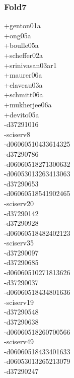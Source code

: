 \begin{multicols}{4}
\subsubsection*{Fold7}
+genton01a\\
+ong05a\\
+boulle05a\\
+scheffer02a\\
+srinivasan03ar1\\
+maurer06a\\
+claveau03a\\
+schmitt06a\\
+mukherjee06a\\
+devito05a\\
-d37291016\\
-sciserv8\\
-d06060510433614325\\
-d37290786\\
-d06060518271300632\\
-d06053013263413063\\
-d37290653\\
-d06060518541902465\\
-sciserv20\\
-d37290142\\
-d37290928\\
-d06060518482402123\\
-sciserv35\\
-d37290097\\
-d37290685\\
-d06060510271813626\\
-d37290037\\
-d06060518434801636\\
-sciserv19\\
-d37290548\\
-d37290638\\
-d06060518260700566\\
-sciserv49\\
-d06060518433401633\\
-d06053013265213079\\
-d37290247\\

\end{multicols}
